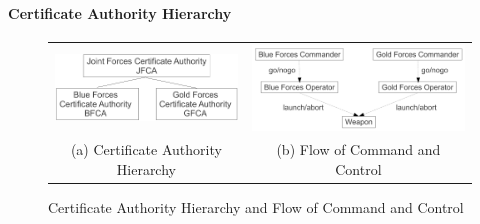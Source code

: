 \paragraph*{Certificate Authority Hierarchy}
\begin{figure}[t]
  \centering
  \begin{tabular}[t]{cc}
    \begin{minipage}{0.48\linewidth}
      \centering
      \includegraphics[width=0.95\linewidth]{Figures/c2conops/CAHierarchy}
    \end{minipage}
    &
    \begin{minipage}{0.48\linewidth}
      \centering
      \includegraphics[width=0.95\linewidth]{Figures/c2conops/conops}
    \end{minipage}\\
    (a) Certificate Authority Hierarchy & (b) Flow of Command and Control\\
  \end{tabular}
  
  \caption{Certificate Authority Hierarchy and Flow of Command and Control}
\label{fig:ca-hierarchy-c2-flow}
\end{figure}

